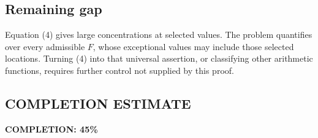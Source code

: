 \subsection*{Remaining gap}
Equation (4) gives large concentrations at selected values. The problem quantifies over every admissible $F$, whose exceptional values may include those selected locations. Turning (4) into that universal assertion, or classifying other arithmetic functions, requires further control not supplied by this proof.
\subsection*{COMPLETION ESTIMATE}
\textbf{COMPLETION: 45\%}
